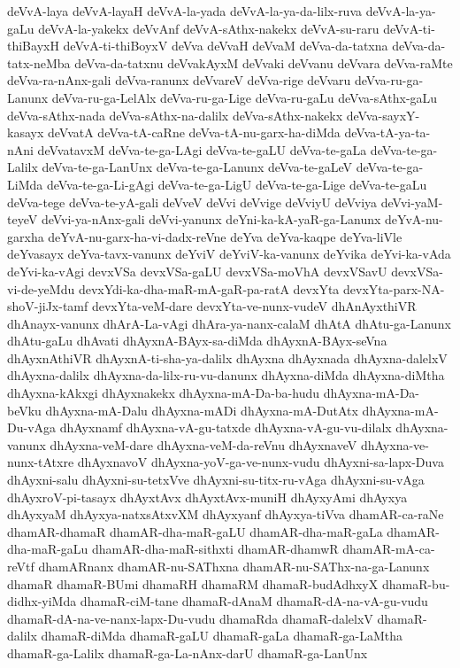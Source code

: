 {deVvA-laya
deVvA-layaH
deVvA-la-yada
deVvA-la-ya-da-lilx-ruva
deVvA-la-ya-gaLu
deVvA-la-yakekx
deVvAnf
deVvA-sAthx-nakekx
deVvA-su-raru
deVvA-ti-thiBayxH
deVvA-ti-thiBoyxV
deVva
deVvaH
deVvaM
deVva-da-tatxna
deVva-da-tatx-neMba
deVva-da-tatxnu
deVvakAyxM
deVvaki
deVvanu
deVvara
deVva-raMte
deVva-ra-nAnx-gali
deVva-ranunx
deVvareV
deVva-rige
deVvaru
deVva-ru-ga-Lanunx
deVva-ru-ga-LelAlx
deVva-ru-ga-Lige
deVva-ru-gaLu
deVva-sAthx-gaLu
deVva-sAthx-nada
deVva-sAthx-na-dalilx
deVva-sAthx-nakekx
deVva-sayxY-kasayx
deVvatA
deVva-tA-caRne
deVva-tA-nu-garx-ha-diMda
deVva-tA-ya-ta-nAni
deVvatavxM
deVva-te-ga-LAgi
deVva-te-gaLU
deVva-te-gaLa
deVva-te-ga-Lalilx
deVva-te-ga-LanUnx
deVva-te-ga-Lanunx
deVva-te-gaLeV
deVva-te-ga-LiMda
deVva-te-ga-Li-gAgi
deVva-te-ga-LigU
deVva-te-ga-Lige
deVva-te-gaLu
deVva-tege
deVva-te-yA-gali
deVveV
deVvi
deVvige
deVviyU
deVviya
deVvi-yaM-teyeV
deVvi-ya-nAnx-gali
deVvi-yanunx
deYni-ka-kA-yaR-ga-Lanunx
deYvA-nu-garxha
deYvA-nu-garx-ha-vi-dadx-reVne
deYva
deYva-kaqpe
deYva-liVle
deYvasayx
deYva-tavx-vanunx
deYviV
deYviV-ka-vanunx
deYvika
deYvi-ka-vAda
deYvi-ka-vAgi
devxVSa
devxVSa-gaLU
devxVSa-moVhA
devxVSavU
devxVSa-vi-de-yeMdu
devxYdi-ka-dha-maR-mA-gaR-pa-ratA
devxYta
devxYta-parx-NA-shoV-jiJx-tamf
devxYta-veM-dare
devxYta-ve-nunx-vudeV
dhAnAyxthiVR
dhAnayx-vanunx
dhArA-La-vAgi
dhAra-ya-nanx-calaM
dhAtA
dhAtu-ga-Lanunx
dhAtu-gaLu
dhAvati
dhAyxnA-BAyx-sa-diMda
dhAyxnA-BAyx-seVna
dhAyxnAthiVR
dhAyxnA-ti-sha-ya-dalilx
dhAyxna
dhAyxnada
dhAyxna-dalelxV
dhAyxna-dalilx
dhAyxna-da-lilx-ru-vu-danunx
dhAyxna-diMda
dhAyxna-diMtha
dhAyxna-kAkxgi
dhAyxnakekx
dhAyxna-mA-Da-ba-hudu
dhAyxna-mA-Da-beVku
dhAyxna-mA-Dalu
dhAyxna-mADi
dhAyxna-mA-DutAtx
dhAyxna-mA-Du-vAga
dhAyxnamf
dhAyxna-vA-gu-tatxde
dhAyxna-vA-gu-vu-dilalx
dhAyxna-vanunx
dhAyxna-veM-dare
dhAyxna-veM-da-reVnu
dhAyxnaveV
dhAyxna-ve-nunx-tAtxre
dhAyxnavoV
dhAyxna-yoV-ga-ve-nunx-vudu
dhAyxni-sa-lapx-Duva
dhAyxni-salu
dhAyxni-su-tetxVve
dhAyxni-su-titx-ru-vAga
dhAyxni-su-vAga
dhAyxroV-pi-tasayx
dhAyxtAvx
dhAyxtAvx-muniH
dhAyxyAmi
dhAyxya
dhAyxyaM
dhAyxya-natxsAtxvXM
dhAyxyanf
dhAyxya-tiVva
dhamAR-ca-raNe
dhamAR-dhamaR
dhamAR-dha-maR-gaLU
dhamAR-dha-maR-gaLa
dhamAR-dha-maR-gaLu
dhamAR-dha-maR-sithxti
dhamAR-dhamwR
dhamAR-mA-ca-reVtf
dhamARnanx
dhamAR-nu-SAThxna
dhamAR-nu-SAThx-na-ga-Lanunx
dhamaR
dhamaR-BUmi
dhamaRH
dhamaRM
dhamaR-budAdhxyX
dhamaR-bu-didhx-yiMda
dhamaR-ciM-tane
dhamaR-dAnaM
dhamaR-dA-na-vA-gu-vudu
dhamaR-dA-na-ve-nanx-lapx-Du-vudu
dhamaRda
dhamaR-dalelxV
dhamaR-dalilx
dhamaR-diMda
dhamaR-gaLU
dhamaR-gaLa
dhamaR-ga-LaMtha
dhamaR-ga-Lalilx
dhamaR-ga-La-nAnx-darU
dhamaR-ga-LanUnx
}
